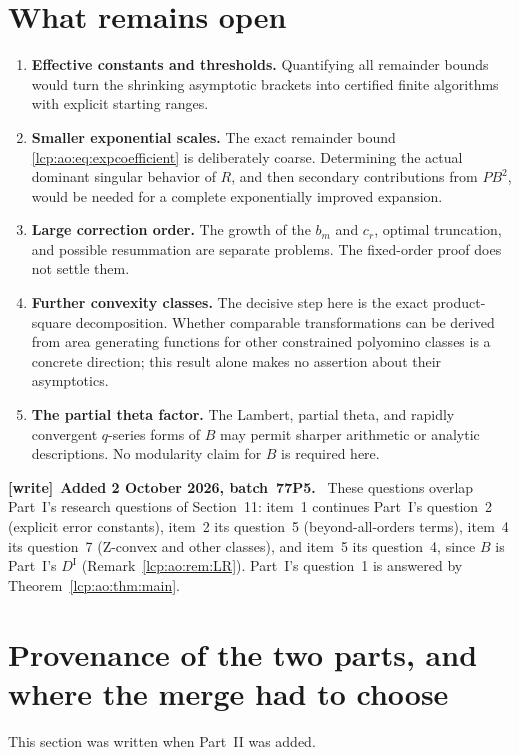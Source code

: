 \documentclass[11pt]{article}
\numberwithin{equation}{section}
\theoremstyle{definition}\newtheorem{definition}[theorem]{Definition}
\theoremstyle{remark}\newtheorem{remark}[theorem]{Remark}
\newenvironment{writenote}[1][]{\par\smallskip\begingroup\small
 \noindent\textbf{[write]}\if\relax\detokenize{#1}\relax\else~\textbf{#1.}\fi\ }%
 {\par\endgroup\smallskip}
\begin{document}
\section{What remains open}\label{lcp:ao:sec:open}
\begin{enumerate}
\item \textbf{Effective constants and thresholds.} Quantifying all remainder bounds would turn the shrinking asymptotic brackets into certified finite algorithms with explicit starting ranges.
\item \textbf{Smaller exponential scales.} The exact remainder bound \eqref{lcp:ao:eq:expcoefficient} is deliberately coarse. Determining the actual dominant singular behavior of $R$, and then secondary contributions from $PB^2$, would be needed for a complete exponentially improved expansion.
\item \textbf{Large correction order.} The growth of the $b_m$ and $c_r$, optimal truncation, and possible resummation are separate problems. The fixed-order proof does not settle them.
\item \textbf{Further convexity classes.} The decisive step here is the exact product-square decomposition. Whether comparable transformations can be derived from area generating functions for other constrained polyomino classes is a concrete direction; this result alone makes no assertion about their asymptotics.
\item \textbf{The partial theta factor.} The Lambert, partial theta, and rapidly convergent $q$-series forms of $B$ may permit sharper arithmetic or analytic descriptions. No modularity claim for $B$ is required here.
\end{enumerate}

\begin{writenote}[Added 2 October 2026, batch~77P5]
These questions overlap Part~I's research questions of Section~11:
item~1 continues Part~I's question~2 (explicit error constants), item~2
its question~5 (beyond-all-orders terms), item~4 its question~7 (Z-convex
and other classes), and item~5 its question~4, since $B$ is Part~I's
$D^{\mathrm I}$ (Remark~\ref{lcp:ao:rem:LR}). Part~I's question~1 is
answered by Theorem~\ref{lcp:ao:thm:main}.
\end{writenote}

\section{Provenance of the two parts, and where the merge had to choose}\label{lcp:ao:sec:provenance}
This section was written when Part~II was added.
\end{document}
